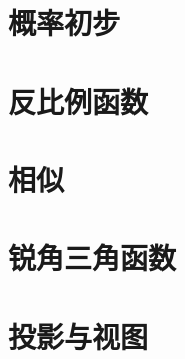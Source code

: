 \documentclass[lang=cn, 10pt, titlestyle=hang, oneside]{elegantbook}
\begin{document}
\chapter{概率初步}

\chapter{反比例函数}

\chapter{相似}

\chapter{锐角三角函数}

\chapter{投影与视图}
\end{document}
